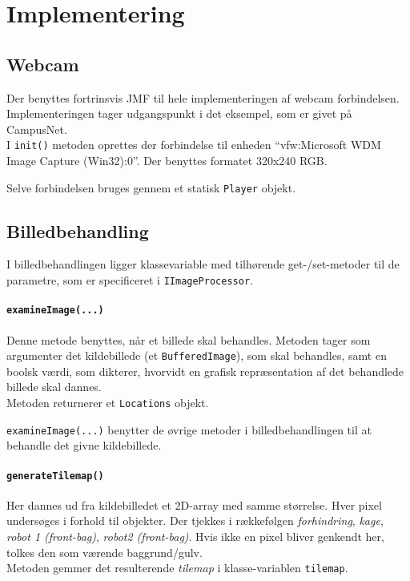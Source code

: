 \section{Implementering}
\subsection{Webcam}
Der benyttes fortrinsvis JMF til hele implementeringen af webcam forbindelsen. Implementeringen tager udgangspunkt i det eksempel, som er givet på CampusNet. \\
I \texttt{init()} metoden oprettes der forbindelse til enheden "`vfw:Microsoft WDM Image Capture (Win32):0"'. Der benyttes formatet 320x240 RGB.

Selve forbindelsen bruges gennem et statisk \texttt{Player} objekt.

\subsection{Billedbehandling}
I billedbehandlingen ligger klassevariable med tilhørende get-/set-metoder til de parametre, som er specificeret i \texttt{IImageProcessor}.

\paragraph{\texttt{examineImage(...)}}
Denne metode benyttes, når et billede skal behandles. Metoden tager som argumenter det kildebillede (et \texttt{BufferedImage}), som skal behandles, samt en boolsk værdi, som dikterer, hvorvidt en grafisk repræsentation af det behandlede billede skal dannes.\\
Metoden returnerer et \texttt{Locations} objekt.

\texttt{examineImage(...)} benytter de øvrige metoder i billedbehandlingen til at behandle det givne kildebillede.

\paragraph{\texttt{generateTilemap()}}
Her dannes ud fra kildebilledet et 2D-array med samme størrelse. Hver pixel undersøges i forhold til  objekter. Der tjekkes i rækkefølgen \textit{forhindring}, \textit{kage}, \textit{robot 1 (front-bag)}, \textit{robot2 (front-bag)}. Hvis ikke en pixel bliver genkendt her, tolkes den som værende baggrund/gulv.\\
Metoden gemmer det resulterende \textit{tilemap} i klasse-variablen \texttt{tilemap}.

